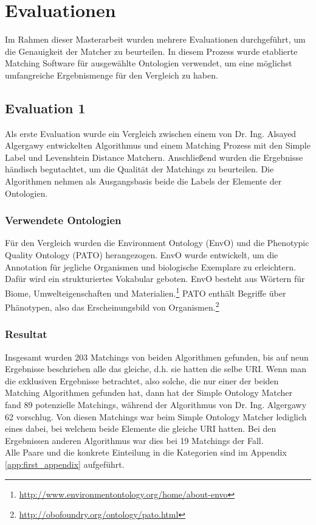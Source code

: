 %
\chapter{Evaluationen}
\label{chap:evaluation}
		
		Im Rahmen dieser Masterarbeit wurden mehrere Evaluationen durchgeführt, um die
		Genauigkeit der Matcher zu beurteilen. In diesem Prozess wurde etablierte
		Matching Software für ausgewählte Ontologien verwendet, um eine möglichst
		umfangreiche Ergebnismenge für den Vergleich zu haben.
		
		\section{Evaluation 1}
		\label{subsec:Evaluation 1}
		Als erste Evaluation wurde ein Vergleich zwischen einem von Dr. Ing. Alsayed
		Algergawy entwickelten Algorithmus und einem Matching Prozess mit den Simple
		Label und Levenshtein Distance Matchern. Anschließend wurden die Ergebnisse
		händisch begutachtet, um die Qualität der Matchings zu beurteilen. Die
		Algorithmen nehmen als Ausgangsbasis beide die Labels der Elemente der
		Ontologien.
		
		\subsection{Verwendete Ontologien}
		Für den Vergleich wurden die Environment Ontology (EnvO) und die Phenotypic
		Quality Ontology (PATO) herangezogen. EnvO wurde entwickelt, um die
		Annotation für jegliche Organismen und biologische Exemplare zu erleichtern.
		Dafür wird ein strukturiertes Vokabular geboten. EnvO besteht aus Wörtern für
		Biome, Umwelteigenschaften und
		Materialien.\footnote{\url{http://www.environmentontology.org/home/about-envo}}
		PATO enthält Begriffe über
		Phänotypen, also das
		Erscheinungsbild von
		Organismen.\footnote{\url{http://obofoundry.org/ontology/pato.html}}
		
		\subsection{Resultat}
		Insgesamt wurden 203 Matchings von beiden Algorithmen gefunden, bis auf neun
		Ergebnisse beschrieben alle das gleiche, d.h. sie hatten die selbe URI.
		Wenn man die exklusiven Ergebnisse betrachtet, also solche, die nur einer
		der beiden Matching Algorithmen gefunden hat, dann hat der Simple Ontology
		Matcher fand 89 potenzielle Matchings, während der Algorithmus von Dr. Ing.
		Algergawy 62 vorschlug. Von diesen Matchings war beim Simple Ontology Matcher
		lediglich eines dabei, bei welchem beide Elemente die gleiche URI hatten. Bei
		den Ergebnissen anderen Algorithmus war dies bei 19 Matchings der Fall.\\
		Alle Paare und die konkrete Einteilung in die Kategorien sind im Appendix
		\ref{app:first_appendix}
		aufgeführt.
		
